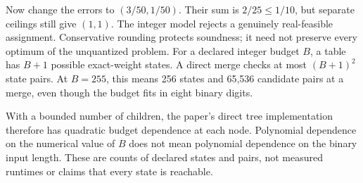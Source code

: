 Now change the errors to $(3/50,1/50)$. Their sum is $2/25\le1/10$, but separate ceilings still give $(1,1)$. The integer model rejects a genuinely real-feasible assignment. Conservative rounding protects soundness; it need not preserve every optimum of the unquantized problem.
For a declared integer budget $B$, a table has $B+1$ possible exact-weight states. A direct merge checks at most $(B+1)^2$ state pairs. At $B=255$, this means 256 states and 65,536 candidate pairs at a merge, even though the budget fits in eight binary digits.

With a bounded number of children, the paper's direct tree implementation therefore has quadratic budget dependence at each node. Polynomial dependence on the numerical value of $B$ does not mean polynomial dependence on the binary input length. These are counts of declared states and pairs, not measured runtimes or claims that every state is reachable.

